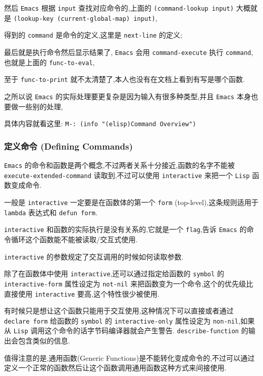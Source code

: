 \documentclass[11pt]{article}
\begin{document}
然后 \texttt{Emacs} 根据 \texttt{input} 查找对应命令的,上面的 \texttt{(command-lookup input)} 大概就是 \texttt{(lookup-key (current-global-map) input)},

得到的 \texttt{command} 是命令的定义,这里是 \texttt{next-line} 的定义;

最后就是执行命令然后显示结果了, \texttt{Emacs} 会用 \texttt{command-execute} 执行 \texttt{command},也就是上面的 \texttt{func-to-eval},

至于 \texttt{func-to-print} 就不太清楚了,本人也没有在文档上看到有写是哪个函数.

之所以说 \texttt{Emacs} 的实际处理要更复杂是因为输入有很多种类型,并且 \texttt{Emacs} 本身也要做一些别的处理,

具体内容就看这里: \texttt{M-: (info "(elisp)Command Overview")}


\subsubsection{定义命令 (Defining Commands)}
\label{sec:orgc0154a8}

\texttt{Emacs} 的命令和函数是两个概念,不过两者关系十分接近,函数的名字不能被 \texttt{execute-extended-command} 读取到,不过可以使用 \texttt{interactive} 来把一个 \texttt{Lisp} 函数变成命令.

一般是 \texttt{interactive} 一定要是在函数体的第一个 \texttt{form} (top-level),这条规则适用于 \texttt{lambda} 表达式和 \texttt{defun form}.

\texttt{interactive} 和函数的实际执行是没有关系的,它就是一个 \texttt{flag},告诉 \texttt{Emacs} 的命令循环这个函数能不能被读取/交互式使用.

\texttt{interactive} 的参数规定了交互调用的时候如何读取参数.

除了在函数体中使用 \texttt{interactive},还可以通过指定给函数的 \texttt{symbol} 的 \texttt{interactive-form} 属性设定为 \texttt{not-nil} 来把函数变为一个命令,这个的优先级比直接使用 \texttt{interactive} 要高,这个特性很少被使用.

有时候只是想让这个函数只能用于交互使用,这种情况下可以直接或者通过 \texttt{declare form} 给函数的 \texttt{symbol} 的 \texttt{interactive-only} 属性设定为 \texttt{non-nil},如果从 \texttt{Lisp} 调用这个命令的话字节码编译器就会产生警告. \texttt{describe-function} 的输出会包含类似的信息.

值得注意的是,通用函数(Generic Functions)是不能转化变成命令的,不过可以通过定义一个正常的函数然后让这个函数调用通用函数这种方式来间接使用.
\end{document}
